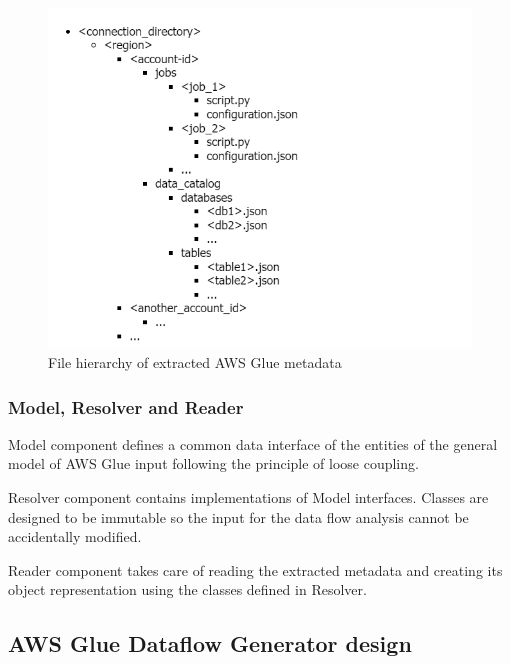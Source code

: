 \begin{figure}[ht]\centering
\includegraphics[width=1.0\textwidth]{img/file_hierarchy.png}
\caption{File hierarchy of extracted AWS Glue metadata}
\label{fig:hierarchy}
\end{figure}

\subsubsection{Model, Resolver and Reader}
Model component defines a common data interface of the entities of the general model of AWS Glue input following the principle of loose coupling.
\par
Resolver component contains implementations of Model interfaces. Classes are designed to be immutable so the input for the data flow analysis cannot be accidentally modified.
\par
Reader component takes care of reading the extracted metadata and creating its object representation using the classes defined in Resolver.

\subsection{AWS Glue Dataflow Generator design}

